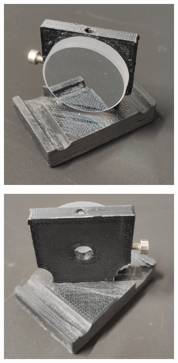 \documentclass[twoside,openright]{scrreprt}
\begin{document}
\begin{figure}[hbtp]
\centering
\begin{subfigure}[t]{0.3\textwidth}
\centering
\includegraphics[width=\columnwidth]{images/TAM/MirrorDropInFront.jpg}
\end{subfigure}
\hfill
\centering
\begin{subfigure}[t]{0.3\textwidth}
\centering
\includegraphics[width=\columnwidth]{images/TAM/MirrorDropInBack.jpg}

\end{subfigure}
\end{figure}
\end{document}
